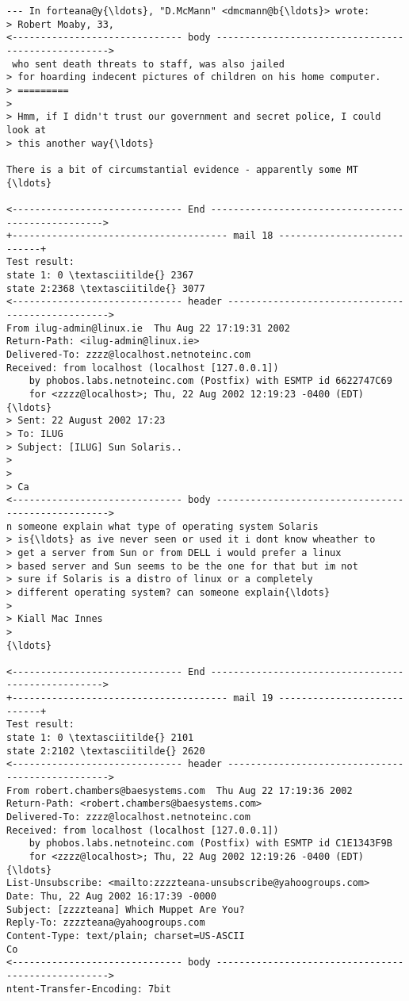 \documentclass[11pt]{article}
\begin{document}
\begin{Verbatim}[commandchars=\\\{\}]
--- In forteana@y{\ldots}, "D.McMann" <dmcmann@b{\ldots}> wrote:
> Robert Moaby, 33,
<------------------------------ body --------------------------------------------------->
 who sent death threats to staff, was also jailed
> for hoarding indecent pictures of children on his home computer.
> =========
> 
> Hmm, if I didn't trust our government and secret police, I could 
look at
> this another way{\ldots}

There is a bit of circumstantial evidence - apparently some MT 
{\ldots}

<------------------------------ End --------------------------------------------------->
+-------------------------------------- mail 18 ----------------------------+
Test result:
state 1: 0 \textasciitilde{} 2367
state 2:2368 \textasciitilde{} 3077
<------------------------------ header ------------------------------------------------->
From ilug-admin@linux.ie  Thu Aug 22 17:19:31 2002
Return-Path: <ilug-admin@linux.ie>
Delivered-To: zzzz@localhost.netnoteinc.com
Received: from localhost (localhost [127.0.0.1])
	by phobos.labs.netnoteinc.com (Postfix) with ESMTP id 6622747C69
	for <zzzz@localhost>; Thu, 22 Aug 2002 12:19:23 -0400 (EDT)
{\ldots}
> Sent: 22 August 2002 17:23
> To: ILUG
> Subject: [ILUG] Sun Solaris..
> 
> 
> Ca
<------------------------------ body --------------------------------------------------->
n someone explain what type of operating system Solaris 
> is{\ldots} as ive never seen or used it i dont know wheather to 
> get a server from Sun or from DELL i would prefer a linux 
> based server and Sun seems to be the one for that but im not 
> sure if Solaris is a distro of linux or a completely 
> different operating system? can someone explain{\ldots}
> 
> Kiall Mac Innes
> 
{\ldots}

<------------------------------ End --------------------------------------------------->
+-------------------------------------- mail 19 ----------------------------+
Test result:
state 1: 0 \textasciitilde{} 2101
state 2:2102 \textasciitilde{} 2620
<------------------------------ header ------------------------------------------------->
From robert.chambers@baesystems.com  Thu Aug 22 17:19:36 2002
Return-Path: <robert.chambers@baesystems.com>
Delivered-To: zzzz@localhost.netnoteinc.com
Received: from localhost (localhost [127.0.0.1])
	by phobos.labs.netnoteinc.com (Postfix) with ESMTP id C1E1343F9B
	for <zzzz@localhost>; Thu, 22 Aug 2002 12:19:26 -0400 (EDT)
{\ldots}
List-Unsubscribe: <mailto:zzzzteana-unsubscribe@yahoogroups.com>
Date: Thu, 22 Aug 2002 16:17:39 -0000
Subject: [zzzzteana] Which Muppet Are You?
Reply-To: zzzzteana@yahoogroups.com
Content-Type: text/plain; charset=US-ASCII
Co
<------------------------------ body --------------------------------------------------->
ntent-Transfer-Encoding: 7bit


\end{Verbatim}
\end{document}
